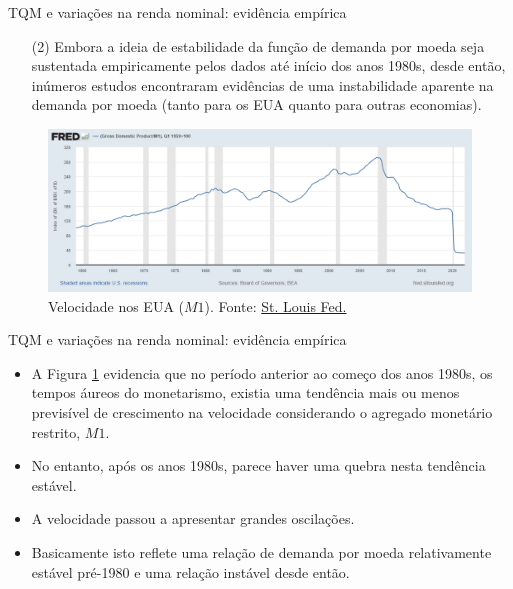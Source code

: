 \documentclass[10pt]{beamer}
\begin{document}
\begin{frame}{TQM e variações na renda nominal: evidência empírica}
    \begin{itemize}
        \item[(2)] Embora a ideia de estabilidade da função de demanda por moeda seja sustentada empiricamente pelos dados até início dos anos 1980s, desde então, inúmeros estudos encontraram evidências de uma instabilidade aparente na demanda por moeda (tanto para os EUA quanto para outras economias).
    \end{itemize}
    \begin{figure}
        \centering
        \includegraphics[width=\textwidth]{./figures/aula10_fig1.png}
        \caption{Velocidade nos EUA ($M1$). Fonte: \href{https://fred.stlouisfed.org/graph/?g=PNOQ}{St. Louis Fed.}}
        \label{fig1}
    \end{figure}
\end{frame}

\begin{frame}{TQM e variações na renda nominal: evidência empírica}
    \begin{itemize}
        \item A Figura \ref{fig1} evidencia que no período anterior ao começo dos anos 1980s, os tempos áureos do monetarismo, existia uma tendência mais ou menos previsível de crescimento na velocidade considerando o agregado monetário restrito, $M1$.
        \bigskip
        \item No entanto, após os anos 1980s, parece haver uma quebra nesta tendência estável.
        \bigskip
        \item A velocidade passou a apresentar grandes oscilações.
        \bigskip
        \item Basicamente isto reflete uma relação de demanda por moeda relativamente estável pré-1980 e uma relação instável desde então.
    \end{itemize}
\end{frame}
\end{document}
